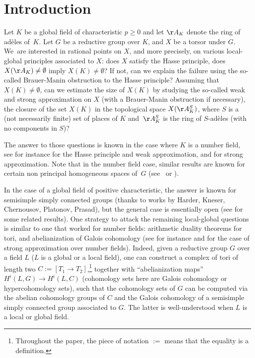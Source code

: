 \section{Introduction}\label{intro}

Let $K$ be a global field of characteristic $p \geq 0$ and let $\AA_K$ denote the ring of adèles of~$K$. Let $G$ be a reductive group over $K$, and $X$ be a torsor under $G$. We~are interested in rational points on $X$, and more precisely, on various local-global \hbox{principles} associated to $X$: does $X$ satisfy the Hasse principle, \ie does $X(\AA_K) \neq \emptyset$ imply $X(K) \neq \emptyset$? If not, can we explain the failure using the so-called Brauer-Manin obstruc\-tion to the Hasse principle? Assuming that $X(K) \neq \emptyset$, can we estimate the size of $X(K)$ by studying the so-called weak and strong approximation on $X$ (with a Brauer-Manin obstruction if necessary), \ie the closure of the set $X(K)$ in the topological space $X(\AA_K^S)$, where $S$ is a (not necessarily finite) set of places of $K$ and~$\AA_K^S$ is the ring of $S$-adèles (with no components in $S$)?

The answer to those questions is known in the case where $K$ is a number field, see for instance \cite[Cor.\,8.7 \& 8.13]{San} for the Hasse principle and weak approximation, and \cite[Th.\,3.14]{demlms} for strong approximation. Note that in the number field case, similar results are known for certain
non principal
homogeneous spaces of~$G$ (see~\cite{Bor} or \cite{BD}).

In the case of a global field of positive characteristic, the answer is known for semisimple simply connected groups (thanks to works by Harder, Kneser, Chernousov, Platonov, Prasad), but the general case is essentially open (see \cite[Th.\,1.9]{Ros} for some related results). One strategy to attack the remaining local-global questions is similar to one that worked for number fields: arithmetic duality theorems for tori, and abelianization of Galois cohomology (see for instance \cite{demphd} and \cite{demlms} for the case of strong approximation over number fields). Indeed, given a reductive group $G$ over a field $L$ (\eg $L$ is a global or a local field), one can construct a complex of tori of length two $C:= [T_1 \to T_2]$,\footnote{Throughout the paper, the piece of notation $:=$
means that the equality is a definition.}
together with ``abelianization maps'' $H^i(L,G) \to H^i(L,C)$ (cohomology sets here are Galois cohomology or hypercohomology sets), such that the cohomology sets of $G$ can be computed via the abelian cohomology groups of $C$ and the Galois cohomology of a semisimple simply connected group associated to $G$. The latter is well-understood when $L$ is a local or global field.

